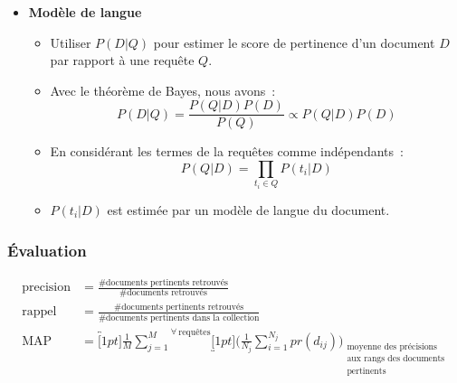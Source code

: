 \documentclass[11pt,aspectratio=43,dvipsnames,table]{beamer}
\begin{document}
\begin{frame}[allowframebreaks]
\begin{itemize}
        \item \textbf{Modèle de langue}~\cite{DBLP:conf/sigir/PonteC98}
        \begin{itemize}
            \item Utiliser $P(D|Q)$ pour estimer le score de pertinence d'un 
                  document $D$ par rapport à une requête $Q$.
            \item Avec le théorème de Bayes, nous avons~:
            \begin{equation*}
              P(D|Q) = \frac{P(Q|D)P(D)}{P(Q)} \propto P(Q|D)P(D)
            \end{equation*}
            \item En considérant les termes de la requêtes comme indépendants~:
            \begin{equation*}
              P(Q|D) = \prod_{t_i \in Q} P(t_i | D)
            \end{equation*}
            \item $P(t_i | D)$ est estimée par un modèle de langue du document.
        \end{itemize}

    \end{itemize}
\end{frame}


\begin{frame}
    \frametitle{\'Evaluation}

    \begin{align*}
    \text{precision} & = \frac{\text{\# documents pertinents retrouvés}}
                              {\text{\# documents retrouvés}}
                              \\[1.5em]
    \text{rappel} & = \frac{\text{\# documents pertinents retrouvés}}
                           {\text{\# documents pertinents dans la collection}}
                           \\[1.5em]
    \text{MAP} & = \overbracket[1pt]{
                      \frac{1}{M} \sum_{j=1}^{M}
                   }^{\forall~\text{requêtes}} 
                   \underbracket[1pt]{
                    \Bigg( \frac{1}{N_j} \sum_{i=1}^{N_j} pr(d_{ij}) \Bigg)
                   }_{
                      \substack{
                        \text{moyenne des précisions} \\ 
                        \text{aux rangs des documents} \\ 
                        \text{pertinents}
                      }
                    }
    \end{align*}

\end{frame}
\end{document}
